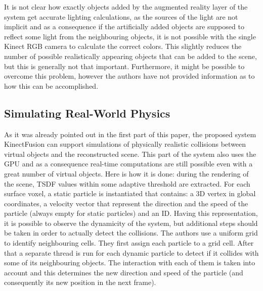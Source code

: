 \documentclass[11pt, a4paper]{article}
\theoremstyle{plain}
\begin{document}
    It is not clear how exactly objects added by the augmented reality layer of
    the system get accurate lighting calculations, as the sources of the light
    are not implicit and as a consequence if the artificially added objects are
    supposed to reflect some light from the neighbouring objects, it is not
    possible with the single Kinect RGB camera to calculate the correct colors.
    This slightly reduces the number of possible realistically appearing objects
    that can be added to the scene, but this is generally not that important.
    Furthermore, it might be possible to overcome this problem, however the
    authors have not provided information as to how this can be accomplished.

  \subsection{Simulating Real-World Physics} %
  \label{sub:Simulating Real-World Physics}
    As it was already pointed out in the first part of this paper, the proposed
    system KinectFusion can support simulations of physically realistic
    collisions between virtual objects and the reconstructed scene. This part of
    the system also uses the GPU and as a consequence real-time computations are
    still possible even with a great number of virtual objects. Here is how it
    is done: during the rendering of the scene, TSDF values within some adaptive
    threshold are extracted. For each surface voxel, a static particle is
    instantiated that contains: a 3D vertex in global coordinates, a velocity
    vector that represent the direction and the speed of the particle (always
    empty for static particles) and an ID. Having this representation, it is
    possible to observe the dynamicity of the system, but additional steps
    should be taken in order to actually detect the collisions. The authors use
    a uniform grid to identify neighbouring cells. They first assign each
    particle to a grid cell. After that a separate thread is run for each
    dynamic particle to detect if it collides with some of its neighbouring
    objects. The interaction with each of them is taken into account and this
    determines the new direction and speed of the particle (and consequently its
    new position in the next frame). 
\end{document}
